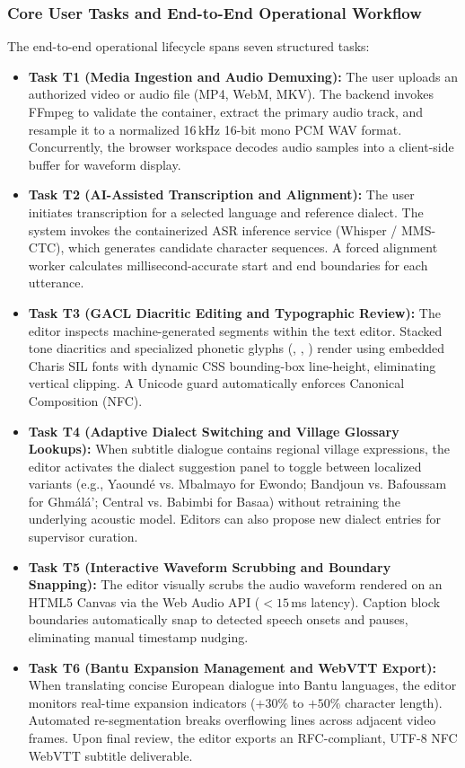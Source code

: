 \documentclass[conference]{IEEEtran}
\begin{document}
\subsubsection{Core User Tasks and End-to-End Operational Workflow}
\label{sec:design:ucd:tasks}
The end-to-end operational lifecycle spans seven structured tasks:
\begin{itemize}
    \item \textbf{Task T1 (Media Ingestion and Audio Demuxing):} The user uploads an authorized video or audio file (MP4, WebM, MKV). The backend invokes FFmpeg to validate the container, extract the primary audio track, and resample it to a normalized 16\,kHz 16-bit mono PCM WAV format. Concurrently, the browser workspace decodes audio samples into a client-side buffer for waveform display.
    \item \textbf{Task T2 (AI-Assisted Transcription and Alignment):} The user initiates transcription for a selected language and reference dialect. The system invokes the containerized ASR inference service (Whisper / MMS-CTC), which generates candidate character sequences. A forced alignment worker calculates millisecond-accurate start and end boundaries for each utterance.
    \item \textbf{Task T3 (GACL Diacritic Editing and Typographic Review):} The editor inspects machine-generated segments within the text editor. Stacked tone diacritics and specialized phonetic glyphs (\textopeno, \textschwa, \textipa{\ng}) render using embedded Charis SIL fonts with dynamic CSS bounding-box line-height, eliminating vertical clipping. A Unicode guard automatically enforces Canonical Composition (NFC).
    \item \textbf{Task T4 (Adaptive Dialect Switching and Village Glossary Lookups):} When subtitle dialogue contains regional village expressions, the editor activates the dialect suggestion panel to toggle between localized variants (e.g., Yaound\'e vs. Mbalmayo for Ewondo; Bandjoun vs. Bafoussam for Gh\textopeno m\'al\'a'; Central vs. Babimbi for Basaa) without retraining the underlying acoustic model. Editors can also propose new dialect entries for supervisor curation.
    \item \textbf{Task T5 (Interactive Waveform Scrubbing and Boundary Snapping):} The editor visually scrubs the audio waveform rendered on an HTML5 Canvas via the Web Audio API ($<15$\,ms latency). Caption block boundaries automatically snap to detected speech onsets and pauses, eliminating manual timestamp nudging.
    \item \textbf{Task T6 (Bantu Expansion Management and WebVTT Export):} When translating concise European dialogue into Bantu languages, the editor monitors real-time expansion indicators ($+30\%$ to $+50\%$ character length). Automated re-segmentation breaks overflowing lines across adjacent video frames. Upon final review, the editor exports an RFC-compliant, UTF-8 NFC WebVTT subtitle deliverable.

\end{itemize}
\end{document}
